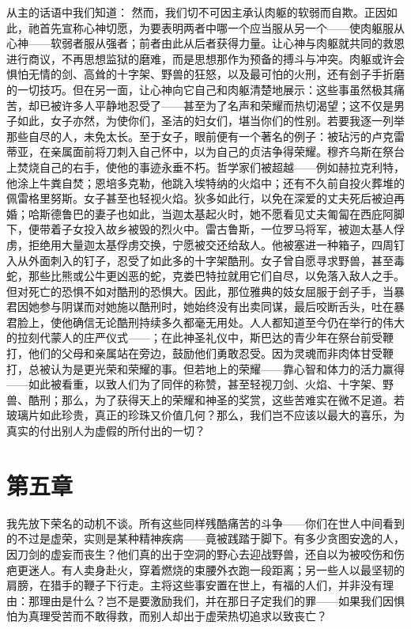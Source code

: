 从主的话语中我们知道：  然而，我们切不可因主承认肉躯的软弱而自欺。正因如此，祂首先宣称心神切愿，为要表明两者中哪一个应当服从另一个——使肉躯服从心神——软弱者服从强者；前者由此从后者获得力量。让心神与肉躯就共同的救恩进行商议，不再思想监狱的磨难，而是思想那作为预备的搏斗与冲突。肉躯或许会惧怕无情的剑、高耸的十字架、野兽的狂怒，以及最可怕的火刑，还有刽子手折磨的一切技巧。但在另一面，让心神向它自己和肉躯清楚地展示：这些事虽然极其痛苦，却已被许多人平静地忍受了——甚至为了名声和荣耀而热切渴望；这不仅是男子如此，女子亦然，为使你们，圣洁的妇女们，堪当你们的性别。若要我逐一列举那些自尽的人，未免太长。至于女子，眼前便有一个著名的例子：被玷污的卢克雷蒂亚，在亲属面前将刀刺入自己怀中，以为自己的贞洁争得荣耀。穆齐乌斯在祭台上焚烧自己的右手，使他的事迹永垂不朽。哲学家们被超越——例如赫拉克利特，他涂上牛粪自焚；恩培多克勒，他跳入埃特纳的火焰中；还有不久前自投火葬堆的佩雷格里努斯。女子甚至也轻视火焰。狄多如此行，以免在深爱的丈夫死后被迫再婚；哈斯德鲁巴的妻子也如此，当迦太基起火时，她不愿看见丈夫匍匐在西庇阿脚下，便带着子女投入故乡被毁的烈火中。雷古鲁斯，一位罗马将军，被迦太基人俘虏，拒绝用大量迦太基俘虏交换，宁愿被交还给敌人。他被塞进一种箱子，四周钉入从外面刺入的钉子，忍受了如此多的十字架酷刑。女子曾自愿寻求野兽，甚至毒蛇，那些比熊或公牛更凶恶的蛇，克娄巴特拉就用它们自尽，以免落入敌人之手。但对死亡的恐惧不如对酷刑的恐惧大。因此，那位雅典的妓女屈服于刽子手，当暴君因她参与阴谋而对她施以酷刑时，她始终没有出卖同谋，最后咬断舌头，吐在暴君脸上，使他确信无论酷刑持续多久都毫无用处。人人都知道至今仍在举行的伟大的拉刻代蒙人的庄严仪式——；在此神圣礼仪中，斯巴达的青少年在祭台前受鞭打，他们的父母和亲属站在旁边，鼓励他们勇敢忍受。因为灵魂而非肉体甘受鞭打，总被认为是更光荣和荣耀的事。但若地上的荣耀——靠心智和体力的活力赢得——如此被看重，以致人们为了同伴的称赞，甚至轻视刀剑、火焰、十字架、野兽、酷刑；那么，为了获得天上的荣耀和神圣的奖赏，这些苦难实在微不足道。若玻璃片如此珍贵，真正的珍珠又价值几何？那么，我们岂不应该以最大的喜乐，为真实的付出别人为虚假的所付出的一切？\par


\section{第五章}

我先放下荣名的动机不谈。所有这些同样残酷痛苦的斗争——你们在世人中间看到的不过是虚荣，实则是某种精神疾病——竟被践踏于脚下。有多少贪图安逸的人，因刀剑的虚妄而丧生？他们真的出于空洞的野心去迎战野兽，还自以为被咬伤和伤疤更迷人。有人卖身赴火，穿着燃烧的束腰外衣跑一段距离；另一些人以最坚韧的肩膀，在猎手的鞭子下行走。主将这些事安置在世上，有福的人们，并非没有理由：那理由是什么？岂不是要激励我们，并在那日子定我们的罪——如果我们因惧怕为真理受苦而不敢得救，而别人却出于虚荣热切追求以致丧亡？\par

